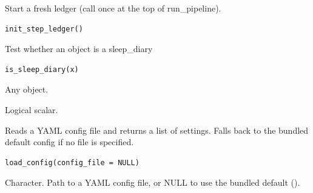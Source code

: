 \documentclass[a4paper]{book}
\begin{document}
%
\begin{Examples}
\end{Examples}
%
\begin{Description}
Start a fresh ledger (call once at the top of run\_pipeline).
\end{Description}
%
\begin{Usage}
\begin{verbatim}
init_step_ledger()
\end{verbatim}
\end{Usage}
%
\begin{Description}
Test whether an object is a sleep\_diary
\end{Description}
%
\begin{Usage}
\begin{verbatim}
is_sleep_diary(x)
\end{verbatim}
\end{Usage}
%
\begin{Arguments}
\begin{ldescription}
\item[\code{x}] Any object.
\end{ldescription}
\end{Arguments}
%
\begin{Value}
Logical scalar.
\end{Value}
%
\begin{Description}
Reads a YAML config file and returns a list of settings.
Falls back to the bundled default config if no file is specified.
\end{Description}
%
\begin{Usage}
\begin{verbatim}
load_config(config_file = NULL)
\end{verbatim}
\end{Usage}
%
\begin{Arguments}
\begin{ldescription}
\item[\code{config\_file}] Character. Path to a YAML config file, or NULL to use
the bundled default ().
\end{ldescription}
\end{Arguments}
\end{document}
